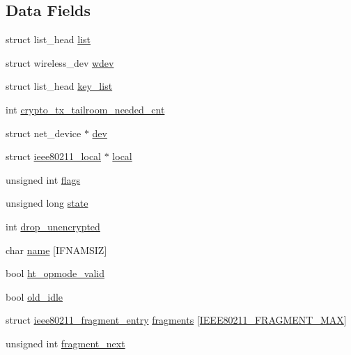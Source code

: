 \subsection*{Data Fields}
\begin{DoxyCompactItemize}
\item 
struct list\-\_\-head \hyperlink{structieee80211__sub__if__data_a1f00f18b91d5a820f2c43064243aa86e}{list}
\item 
struct wireless\-\_\-dev \hyperlink{structieee80211__sub__if__data_adff11b1d40a62f52e85ded7d6428fab3}{wdev}
\item 
struct list\-\_\-head \hyperlink{structieee80211__sub__if__data_a173cf05f7d6b8bf98fc09f1bb95bfe7e}{key\-\_\-list}
\item 
int \hyperlink{structieee80211__sub__if__data_aa7af642ddb25d678f33953eaaddcb0d8}{crypto\-\_\-tx\-\_\-tailroom\-\_\-needed\-\_\-cnt}
\item 
struct net\-\_\-device $\ast$ \hyperlink{structieee80211__sub__if__data_abf690dbcccc005ba94a1ce16864ccdc9}{dev}
\item 
struct \hyperlink{structieee80211__local}{ieee80211\-\_\-local} $\ast$ \hyperlink{structieee80211__sub__if__data_ad436a024f420f219c4fe2eebce7e4ab2}{local}
\item 
unsigned int \hyperlink{structieee80211__sub__if__data_ac92588540e8c1d014a08cd8a45462b19}{flags}
\item 
unsigned long \hyperlink{structieee80211__sub__if__data_af7504fc0e249186b115eb5f51a297878}{state}
\item 
int \hyperlink{structieee80211__sub__if__data_a33cb37aebf5eb2cdb7b07dffd48e9a92}{drop\-\_\-unencrypted}
\item 
char \hyperlink{structieee80211__sub__if__data_a9ea12d6fc5b2c586092468ee1a86162a}{name} \mbox{[}I\-F\-N\-A\-M\-S\-I\-Z\mbox{]}
\item 
bool \hyperlink{structieee80211__sub__if__data_a1e7e518fe4dd44b1cb51205645f7c8e9}{ht\-\_\-opmode\-\_\-valid}
\item 
bool \hyperlink{structieee80211__sub__if__data_a3bf326db8dc3ffdc0338743371dfc65b}{old\-\_\-idle}
\item 
struct \hyperlink{structieee80211__fragment__entry}{ieee80211\-\_\-fragment\-\_\-entry} \hyperlink{structieee80211__sub__if__data_a9dabb064f92940c0ae438c43f2e7d3a3}{fragments} \mbox{[}\hyperlink{ieee80211__i_8h_a32100053624b6475db2038cace00b40f}{I\-E\-E\-E80211\-\_\-\-F\-R\-A\-G\-M\-E\-N\-T\-\_\-\-M\-A\-X}\mbox{]}
\item 
unsigned int \hyperlink{structieee80211__sub__if__data_ab09b05e01b312174ceac7542e54c060a}{fragment\-\_\-next}

\end{DoxyCompactItemize}
